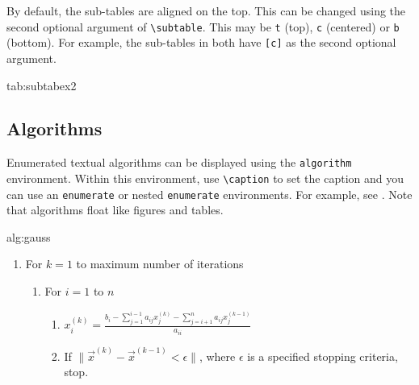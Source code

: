 \documentclass[pmlr,twocolumn,10pt]{jmlr} %
\begin{document}
By default, the sub-tables are aligned on the top.
This can be changed using the second optional argument
of \verb|\subtable|. This may be \texttt{t} (top), \texttt{c}
(centered) or \texttt{b} (bottom). For example, the sub-tables
 in 
both have \verb|[c]| as the second optional argument.

\begin{table}[htbp]
\floatconts
 {tab:subtabex2}
 {\caption{Another Example With Sub-Tables}}
 {%
   \qquad
 }
\end{table}

\subsection{Algorithms}
\label{sec:algorithms}

Enumerated textual algorithms can be displayed using the
\texttt{algorithm} environment. Within this environment, use
\verb|\caption| to set the caption and you can use an
\texttt{enumerate} or nested \texttt{enumerate} environments.
For example, see . Note that algorithms
float like figures and tables.

\begin{algorithm}[htbp]
\floatconts
  {alg:gauss}%
  {\caption{The Gauss-Seidel Algorithm}}%
{%
\begin{enumerate}
  \item For $k=1$ to maximum number of iterations
    \begin{enumerate}
      \item For $i=1$ to $n$
        \begin{enumerate}
        \item $x_i^{(k)} = 
          \frac{b_i - \sum_{j=1}^{i-1}a_{ij}x_j^{(k)}
          - \sum_{j=i+1}^{n}a_{ij}x_j^{(k-1)}}{a_{ii}}$
        \item If $\|\vec{x}^{(k)}-\vec{x}^{(k-1)} < \epsilon\|$,
          where $\epsilon$ is a specified stopping criteria, stop.
      \end{enumerate}
    \end{enumerate}
\end{enumerate}
}%
\end{algorithm}
\end{document}
